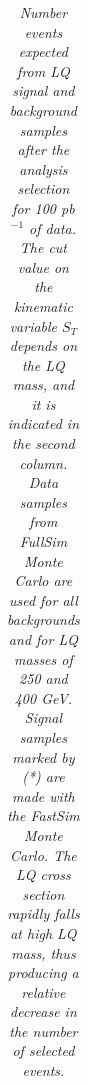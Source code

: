 \begin{table}[htbp]
\begin{center}
\begin{tabular}{|lccc||ccc|}
\hline\hline
\end{tabular}
\end{center}
\caption{\small \sl Number events expected from LQ signal and background samples after the analysis selection for 100 pb$^{-1}$ of data.
The cut value on the kinematic variable $S_T$ depends on the LQ mass, and it is indicated in the second column.
Data samples from FullSim Monte Carlo are used for all backgrounds and for LQ masses of 250 and 400 GeV. 
Signal samples marked by (*) are made with the FastSim Monte Carlo.
The LQ cross section rapidly falls at high LQ mass, thus producing a relative decrease in the number of selected events. } 
\label{tab:EventSelSummary}
\end{table}

